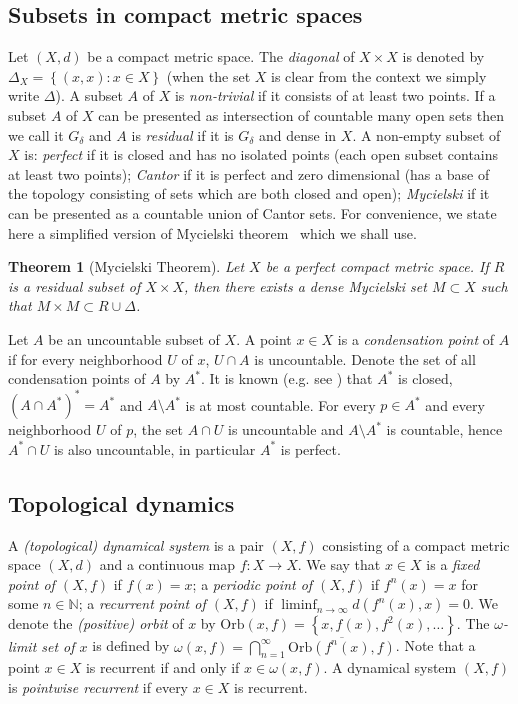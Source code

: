 \documentclass[reqno,a4paper,12pt]{amsart}
\newtheorem{thm}{Theorem}[section]
\theoremstyle{definition}
\numberwithin{equation}{section}
\begin{document}
\subsection{Subsets in compact metric spaces}
Let $(X,d)$ be a compact metric space.
The \emph{diagonal} of $X\times X$ is denoted by
$\Delta_X={\left\{{(x,x) : x\in X}\right\}}$ (when the set $X$ is clear from the context we simply write $\Delta$).
A subset $A$ of $X$ is \emph{non-trivial} if it consists of at least two points.
If a subset $A$ of $X$ can be presented as intersection of
countable many open sets then we call it $G_\delta$ and $A$ is \emph{residual} if it is $G_\delta$ and dense in $X$.
A non-empty subset of $X$ is: \emph{perfect} if it is closed and has no isolated points
(each open subset contains at least two points);
\emph{Cantor} if it is perfect and zero dimensional (has a base of the topology consisting of sets which are both closed and open);
\emph{Mycielski} if it can be presented as a countable union of Cantor sets.
For convenience, we state here a simplified version of Mycielski theorem~\cite[Theorem~1]{M64} which we shall use.

\begin{thm}[Mycielski Theorem]
Let $X$ be a perfect compact metric space.
If $R$ is a residual subset of $X\times X$,
then there exists a dense Mycielski set $M\subset X$ such that $M\times M\subset R\cup\Delta$.
\end{thm}

Let $A$ be an uncountable subset of $X$.
A point $x\in X$ is a \emph{condensation point} of $A$
if for every neighborhood $U$ of $x$, $U\cap A$ is uncountable.
Denote the set of all condensation points of $A$ by $A^*$. It is known (e.g. see \cite[\S23]{KurVolI}) that $A^*$ is closed, $(A\cap A^*)^*=A^*$ and
$A\setminus A^*$ is at most countable.
For every $p\in A^*$ and every neighborhood $U$ of $p$, the set $A\cap U$ is uncountable
and $A\setminus A^*$ is countable, hence $A^* \cap U$ is also uncountable, in particular $A^*$ is perfect.

\subsection{Topological dynamics}
A \emph{(topological) dynamical system} is a pair $(X,f)$ consisting of a compact metric space $(X,d)$
and a continuous map $f\colon X\to X$.
We say that $x\in X$ is a \emph{fixed point of $(X, f)$} if $f (x)= x$;
a \emph{periodic point of $(X, f)$} if $f^n (x)= x$ for some $n\in {\mathbb{N}}$; a \emph{recurrent point of $(X, f)$} if
$\liminf_{n\to\infty}d(f^n(x),x)=0$.
We denote the \emph{(positive) orbit} of $x$ by ${\mbox{Orb}}(x,f)={\left\{{x,f(x),f^2(x),\ldots}\right\}}$.
The \emph{$\omega$-limit set of $x$} is defined by $\omega(x,f)=\bigcap_{n=1}^\infty \overline{{\mbox{Orb}}(f^n(x),f)}$.
Note that a point $x\in X$ is recurrent if and only if $x\in \omega(x,f)$.
A dynamical system $(X,f)$ is \emph{pointwise recurrent} if every $x\in X$ is recurrent.
\end{document}
